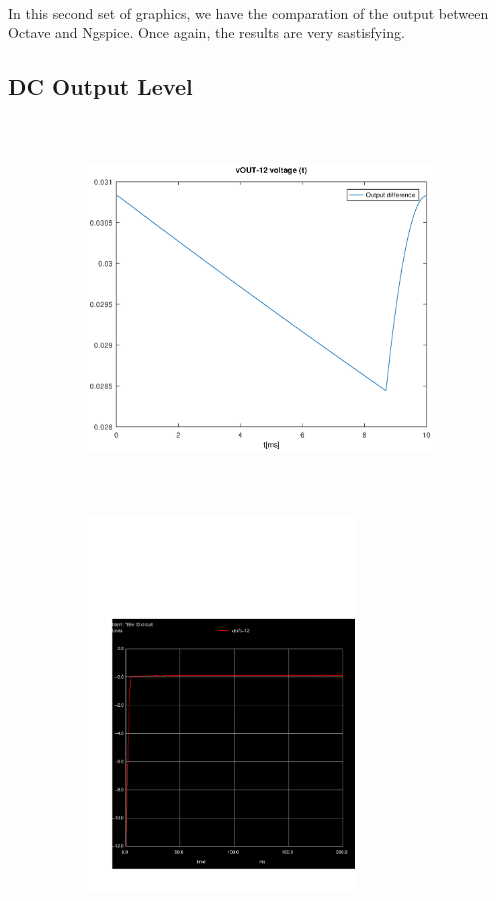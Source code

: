 \paragraph{}
In this second set of graphics, we have the comparation of the output between Octave and Ngspice. Once again, the results are very sastisfying.

\subsection{DC Output Level}
\label{subsec:third_topic_error}


\begin{figure}[H]

\begin{subfigure}{0.5\textwidth}
\includegraphics[width=0.9\linewidth, height=10cm]{outputdiff.eps} 
\label{fig:theothirdcompare}
\end{subfigure}
\begin{subfigure}{0.5\textwidth}
\includegraphics[width=0.9\linewidth, height=10cm]{trans3.pdf}
\label{fig:simthirdcompare}
\end{subfigure}

\label{fig:compar3}
\end{figure}

